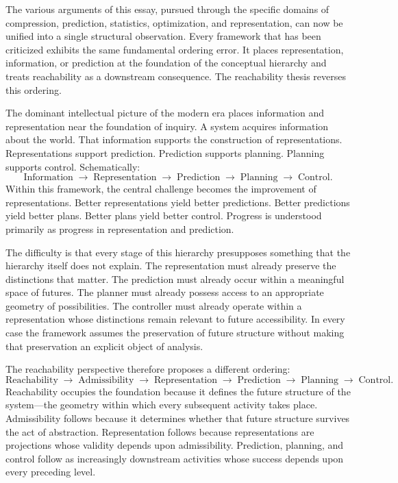 \documentclass[12pt,a4paper]{article}
\theoremstyle{plain}
\theoremstyle{definition}
\theoremstyle{remark}
\begin{document}
The various arguments of this essay, pursued through the specific domains of
compression, prediction, statistics, optimization, and representation, can
now be unified into a single structural observation. Every framework that
has been criticized exhibits the same fundamental ordering error. It places
representation, information, or prediction at the foundation of the
conceptual hierarchy and treats reachability as a downstream consequence.
The reachability thesis reverses this ordering.

The dominant intellectual picture of the modern era places information and
representation near the foundation of inquiry. A system acquires information
about the world. That information supports the construction of
representations. Representations support prediction. Prediction supports
planning. Planning supports control. Schematically:
\[
  \text{Information}
  \;\rightarrow\;
  \text{Representation}
  \;\rightarrow\;
  \text{Prediction}
  \;\rightarrow\;
  \text{Planning}
  \;\rightarrow\;
  \text{Control}.
\]
Within this framework, the central challenge becomes the improvement of
representations. Better representations yield better predictions. Better
predictions yield better plans. Better plans yield better control. Progress
is understood primarily as progress in representation and prediction.

The difficulty is that every stage of this hierarchy presupposes something
that the hierarchy itself does not explain. The representation must already
preserve the distinctions that matter. The prediction must already occur
within a meaningful space of futures. The planner must already possess
access to an appropriate geometry of possibilities. The controller must
already operate within a representation whose distinctions remain relevant
to future accessibility. In every case the framework assumes the preservation
of future structure without making that preservation an explicit object of
analysis.

The reachability perspective therefore proposes a different ordering:
\[
  \text{Reachability}
  \;\rightarrow\;
  \text{Admissibility}
  \;\rightarrow\;
  \text{Representation}
  \;\rightarrow\;
  \text{Prediction}
  \;\rightarrow\;
  \text{Planning}
  \;\rightarrow\;
  \text{Control}.
\]
Reachability occupies the foundation because it defines the future structure
of the system---the geometry within which every subsequent activity takes
place. Admissibility follows because it determines whether that future
structure survives the act of abstraction. Representation follows because
representations are projections whose validity depends upon admissibility.
Prediction, planning, and control follow as increasingly downstream
activities whose success depends upon every preceding level.
\end{document}
